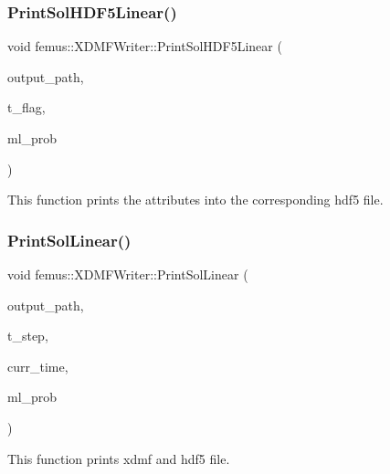 \subsubsection{\texorpdfstring{Print\+Sol\+H\+D\+F5\+Linear()}{PrintSolHDF5Linear()}}
{\footnotesize\ttfamily void femus\+::\+X\+D\+M\+F\+Writer\+::\+Print\+Sol\+H\+D\+F5\+Linear (\begin{DoxyParamCaption}\item[{const std\+::string}]{output\+\_\+path,  }\item[{const \mbox{\hyperlink{_typedefs_8hpp_a91ad9478d81a7aaf2593e8d9c3d06a14}{uint}}}]{t\+\_\+flag,  }\item[{const \mbox{\hyperlink{classfemus_1_1_multi_level_problem}{Multi\+Level\+Problem}} \&}]{ml\+\_\+prob }\end{DoxyParamCaption})\hspace{0.3cm}{\ttfamily [static]}}



This function prints the attributes into the corresponding hdf5 file. 

\mbox{\label{classfemus_1_1_x_d_m_f_writer_a192252d5f9ace15cb9cd62268ab7ff7f}} 
\subsubsection{\texorpdfstring{Print\+Sol\+Linear()}{PrintSolLinear()}}
{\footnotesize\ttfamily void femus\+::\+X\+D\+M\+F\+Writer\+::\+Print\+Sol\+Linear (\begin{DoxyParamCaption}\item[{const std\+::string}]{output\+\_\+path,  }\item[{const \mbox{\hyperlink{_typedefs_8hpp_a91ad9478d81a7aaf2593e8d9c3d06a14}{uint}}}]{t\+\_\+step,  }\item[{const double}]{curr\+\_\+time,  }\item[{const \mbox{\hyperlink{classfemus_1_1_multi_level_problem}{Multi\+Level\+Problem}} \&}]{ml\+\_\+prob }\end{DoxyParamCaption})\hspace{0.3cm}{\ttfamily [static]}}



This function prints xdmf and hdf5 file. 

